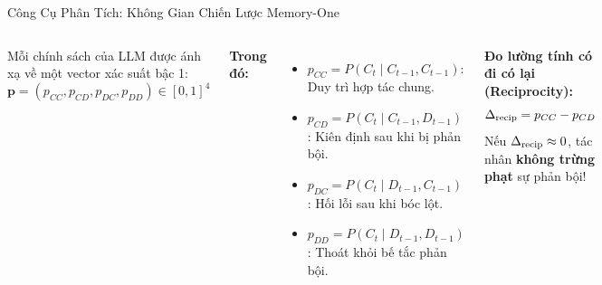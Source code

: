 \documentclass[aspectratio=169,9pt]{beamer}
\begin{document}
\begin{frame}{Công Cụ Phân Tích: Không Gian Chiến Lược Memory-One}

\begin{columns}[T]

Mỗi chính sách của LLM được ánh xạ về một vector xác suất bậc 1:
\[
  \mathbf{p} = (p_{CC}, p_{CD}, p_{DC}, p_{DD}) \in [0, 1]^4
\]

\vspace{0.4em}
\textbf{Trong đó:}
\begin{itemize}\setlength\itemsep{4pt}
  \item $p_{CC} = P(C_{t} \mid C_{t-1}, C_{t-1})$: Duy trì hợp tác chung.
  \item $p_{CD} = P(C_{t} \mid C_{t-1}, D_{t-1})$: Kiên định sau khi bị phản bội.
  \item $p_{DC} = P(C_{t} \mid D_{t-1}, C_{t-1})$: Hối lỗi sau khi bóc lột.
  \item $p_{DD} = P(C_{t} \mid D_{t-1}, D_{t-1})$: Thoát khỏi bế tắc phản bội.
\end{itemize}

\vspace{0.4em}
\begin{primarybox}
\footnotesize \textbf{Đo lường tính có đi có lại (Reciprocity):}
\[ \Delta_{\rm recip} = p_{CC} - p_{CD} \]
Nếu $\Delta_{\rm recip} \approx 0$, tác nhân \textbf{không trừng phạt} sự phản bội!
\end{primarybox}

\vspace{0.2em}

\begin{center}
\end{center}
\end{columns}
\end{frame}
\end{document}
